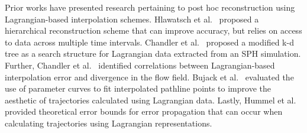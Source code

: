 Prior works have presented research pertaining to post hoc reconstruction using Lagrangian-based interpolation schemes.
%
Hlawatsch et al.~\cite{hlawatsch2011hierarchical} proposed a hierarchical reconstruction scheme that can improve accuracy, but relies on access to data across multiple time intervals.
%
Chandler et al.~\cite{chandler2015interpolation} proposed a modified k-d tree as a search structure for Lagrangian data extracted from an SPH simulation.
%
Further, Chandler et al.~\cite{chandler2016analysis} identified correlations between Lagrangian-based interpolation error and divergence in the flow field.
%
Bujack et al.~\cite{bujack2015lagrangian} evaluated the use of parameter curves to fit interpolated pathline points to improve the aesthetic of trajectories calculated using Lagrangian data.
%
Lastly, Hummel et al.~\cite{hummel2016error} provided theoretical error bounds for error propagation that can occur when calculating trajectories using Lagrangian representations. 
%


\vspace{-1mm}
